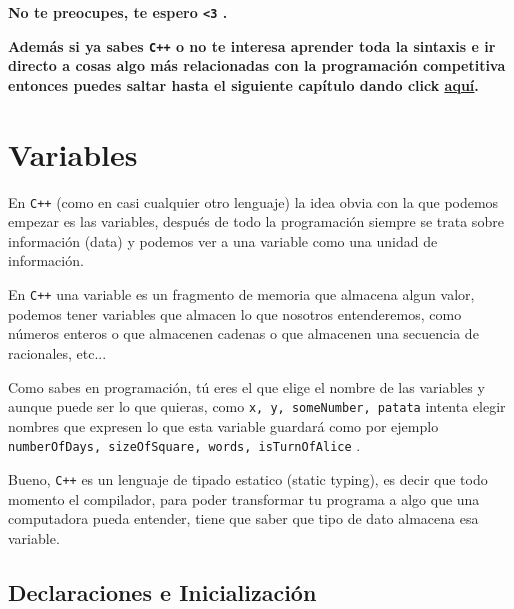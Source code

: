 \documentclass[12pt, fleqn]{report}                             %
\theoremstyle{break}                                            %
\newcommand{\textCode}[1]  { \texttt{#1} }                      %
\newcommand{\Cpp}{\ignorespaces\textCode{C++}}                  %
\begin{document}
        \textbf{
            No te preocupes, te espero \textCode{<3}.
        }
        
        \textbf{
            Además si ya sabes \Cpp o no te interesa aprender toda la sintaxis e ir directo a cosas
            algo más relacionadas con la programación competitiva entonces puedes saltar hasta el
            siguiente capítulo dando click \underline{\hyperref[part:EstructurasDeDatosBasicas]{aquí}}.
        }



        \clearpage
        \section{Variables}

            En \Cpp (como en casi cualquier otro lenguaje) la idea obvia con la que podemos empezar
            es las variables, después de todo la programación siempre se trata sobre información (data) 
            y podemos ver a una variable como una unidad de información.

            En \Cpp una variable es un fragmento de memoria que almacena algun valor, 
            podemos tener variables que almacen lo que nosotros entenderemos, como números enteros
            o que almacenen cadenas o que almacenen una secuencia de racionales, etc...

            Como sabes en programación, tú eres el que elige el nombre de las variables y aunque puede
            ser lo que quieras, como \textCode{x, y, someNumber, patata} intenta elegir nombres que expresen
            lo que esta variable guardará como por ejemplo \textCode{numberOfDays, sizeOfSquare, words, isTurnOfAlice}. 

            Bueno, \Cpp es un lenguaje de tipado estatico (static typing), es decir que todo momento el compilador,
            para poder transformar tu programa a algo que una computadora pueda entender, tiene
            que saber que tipo de dato almacena esa variable.

            \subsection{Declaraciones e Inicialización}
\end{document}
